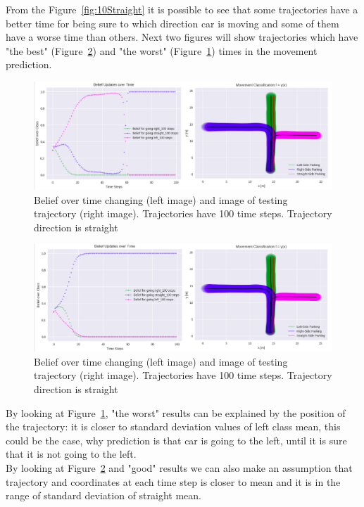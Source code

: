From the Figure~\ref{fig:10Straight} it is possible to see that some trajectories have a better time for being sure to which direction car is moving and some of them have a worse time than others. Next two figures will show trajectories which have "the best" (Figure~\ref{fig:StraightGood}) and "the worst" (Figure~\ref{fig:StraightBad}) times in the movement prediction.

\begin{figure}[h]
	\centering  	
	\includegraphics[width=15cm]{img/bad_straight_tr.jpg}
	\caption{Belief over time changing (left image) and image of testing trajectory (right image). Trajectories have 100 time steps. Trajectory direction is straight}
	\label{fig:StraightBad}    
\end{figure}

\begin{figure}[h]
	\centering  	
	\includegraphics[width=15cm]{img/good_straight_tr.jpg}
	\caption{Belief over time changing (left image) and image of testing trajectory (right image). Trajectories have 100 time steps. Trajectory direction is straight}
	\label{fig:StraightGood}    
\end{figure}

By looking at Figure~\ref{fig:StraightBad}, "the worst" results can be explained by the position of the trajectory: it is closer to standard deviation values of left class mean, this could be the case, why prediction is that car is going to the left, until it is sure that it is not going to the left. \\
By looking at Figure~\ref{fig:StraightGood} and "good" results we can also make an assumption that trajectory and coordinates at each time step is closer to mean and it is in the range of standard deviation of straight mean.

